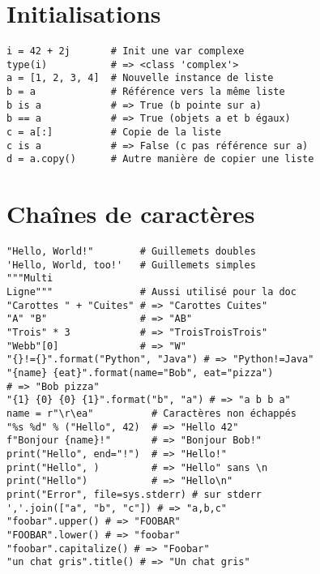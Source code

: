 \documentclass{article}
\begin{document}
\begin{multicols*}{4}
\section*{Initialisations}

\begin{lstlisting}
i = 42 + 2j       # Init une var complexe
type(i)           # => <class 'complex'>
a = [1, 2, 3, 4]  # Nouvelle instance de liste 
b = a             # Référence vers la même liste
b is a            # => True (b pointe sur a)
b == a            # => True (objets a et b égaux)
c = a[:]          # Copie de la liste
c is a            # => False (c pas référence sur a)
d = a.copy()      # Autre manière de copier une liste
\end{lstlisting}

\section*{Chaînes de caractères}

\begin{lstlisting}
"Hello, World!"        # Guillemets doubles
'Hello, World, too!'   # Guillemets simples
"""Multi 
Ligne"""               # Aussi utilisé pour la doc
"Carottes " + "Cuites" # => "Carottes Cuites"
"A" "B"                # => "AB"
"Trois" * 3            # => "TroisTroisTrois"
"Webb"[0]              # => "W"
"{}!={}".format("Python", "Java") # => "Python!=Java"
"{name} {eat}".format(name="Bob", eat="pizza") 
# => "Bob pizza"
"{1} {0} {0} {1}".format("b", "a") # => "a b b a"
name = r"\r\ea"          # Caractères non échappés
"%s %d" % ("Hello", 42)  # => "Hello 42"
f"Bonjour {name}!"       # => "Bonjour Bob!"
print("Hello", end="!")  # => "Hello!"
print("Hello", )         # => "Hello" sans \n
print("Hello")           # => "Hello\n"
print("Error", file=sys.stderr) # sur stderr 
','.join(["a", "b", "c"]) # => "a,b,c"
"foobar".upper() # => "FOOBAR"
"FOOBAR".lower() # => "foobar"
"foobar".capitalize() # => "Foobar"
"un chat gris".title() # => "Un chat gris"

\end{lstlisting}


\end{multicols*}
\end{document}
